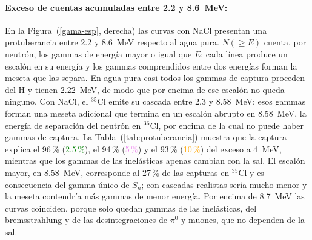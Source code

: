 \paragraph{Exceso de cuentas acumuladas entre 2.2 y 8.6~MeV:} En la Figura~(\ref{gama-esp}, derecha) las curvas con NaCl presentan una protuberancia entre 2.2 y 8.6~MeV respecto al agua pura. $N(\geq E)$ cuenta, por neutrón, los gammas de energía mayor o igual que $E$: cada línea produce un escalón en su energía y los gammas comprendidos entre dos energías forman la meseta que las separa. En agua pura casi todos los gammas de captura proceden del H y tienen 2.22~MeV, de modo que por encima de ese escalón no queda ninguno. Con NaCl, el $^{35}$Cl emite su cascada entre 2.3 y 8.58~MeV: esos gammas forman una meseta adicional que termina en un escalón abrupto en 8.58~MeV, la energía de separación del neutrón en $^{36}$Cl, por encima de la cual no puede haber gammas de captura. La Tabla~(\ref{tab:protuberancia}) muestra que la captura explica el 96\,\% (\textcolor{green}{2.5\,\%}), el 94\,\% (\textcolor{violet}{5\,\%}) y el 93\,\% (\textcolor{orange}{10\,\%}) del exceso a 4~MeV, mientras que los gammas de las inelásticas apenas cambian con la sal. El escalón mayor, en 8.58~MeV, corresponde al 27\,\% de las capturas en $^{35}$Cl y es consecuencia del gamma único de $S_n$; con cascadas realistas sería mucho menor y la meseta contendría más gammas de menor energía. Por encima de 8.7~MeV las curvas coinciden, porque solo quedan gammas de las inelásticas, del bremsstrahlung y de las desintegraciones de $\pi^{0}$ y muones, que no dependen de la sal.


